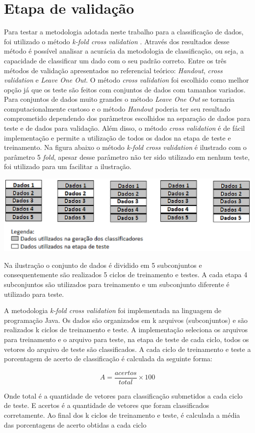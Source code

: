 \section{Etapa de validação}
Para testar a metodologia adotada neste trabalho para a classificação de dados, foi utilizado o método \textit{k-fold cross validation} \cite{Kohavi95Cross} \cite{Baldisserotto05Validacao}. Através dos resultados desse método é possível analisar a acurácia da metodologia de classificação, ou seja, a capacidade de classificar um dado com o seu padrão correto.
Entre os três métodos de validação apresentados no referencial teórico: \textit{Handout}, \textit{cross validation} e \textit{Leave One Out}. O método \textit{cross validation} foi escolhido como melhor opção já que os teste são feitos com conjuntos de dados com tamanhos variados. Para conjuntos de dados muito grandes o método \textit{Leave One Out} se tornaria computacionalmente custoso e o método \textit{Handout} poderia ter seu resultado comprometido dependendo dos parâmetros escolhidos na separação de dados para teste e de dados para validação. Além disso, o método \textit{cross validation} é de fácil implementação e permite a utilização de todos os dados na etapa de teste e treinamento.
Na figura abaixo o método \textit{k-fold cross validation} é ilustrado com o parâmetro 5 \textit{fold}, apesar desse parâmetro não ter sido utilizado em nenhum teste, foi utilizado para um facilitar a ilustração. 
\begin{center}
	\includegraphics[scale=1.0]{graficos/cross_validation}
	\label{img:cross_validation}
\end{center}

Na ilustração o conjunto de dados é dividido em 5 subconjuntos e consequentemente são realizados 5 ciclos de treinamento e testes. A cada etapa 4 subconjuntos são utilizados para treinamento e um subconjunto diferente é utilizado para teste. 

A metodologia \textit{k-fold cross validation} foi implementada na linguagem de programação Java. Os dados são organizados em k arquivos (subconjuntos) e são realizados k ciclos de treinamento e teste. A implementação seleciona os arquivos para treinamento e o arquivo para teste, na etapa de teste de cada ciclo, todos os vetores do arquivo de teste são classificados. A cada ciclo de treinamento e teste a porcentagem de acerto de classificação é calculada da seguinte forma:

$$A = \frac{acertos}{total}\times 100$$

Onde total é a quantidade de vetores para classificação submetidos a cada ciclo de teste. E acertos é a quantidade de vetores que foram classificados corretamente.
Ao final dos k ciclos de treinamento e teste, é calculada a média das porcentagens de acerto obtidas a cada ciclo
